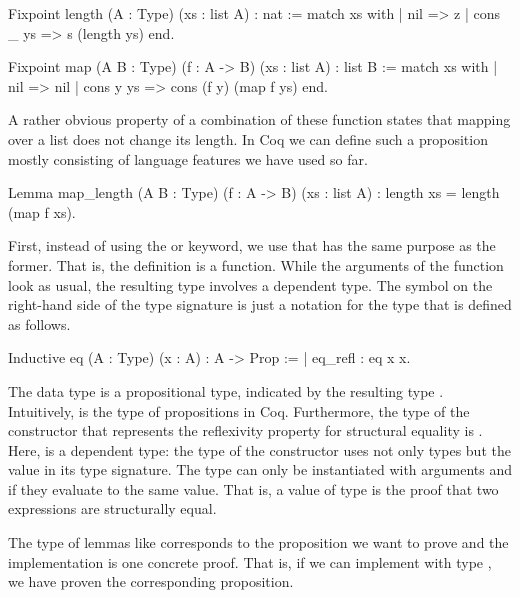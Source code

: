 \begin{coqcode}
Fixpoint length (A : Type) (xs : list A) : nat :=
  match xs with
  | nil       => z
  | cons _ ys => s (length ys)
  end.

Fixpoint map (A B : Type) (f : A -> B) (xs : list A) : list B :=
  match xs with
  | nil => nil
  | cons y ys => cons (f y) (map f ys)
  end.
\end{coqcode}

A rather obvious property of a combination of these function states that mapping over a list does not change its length.
In Coq we can define such a proposition mostly consisting of language features we have used so far.

\begin{coqcode}
Lemma map_length (A B : Type) (f : A -> B) (xs : list A)
  : length xs = length (map f xs).
\end{coqcode}

First, instead of using the  or  keyword, we use  that has the same purpose as the former.
That is, the definition  is a function.
While the arguments of the function  look as usual, the resulting type involves a dependent type.
The symbol \cinl{=} on the right\--hand side of the type signature is just a notation for the type  that is defined as follows.

\begin{coqcode}
Inductive eq (A : Type) (x : A) : A -> Prop :=
| eq_refl : eq x x.
\end{coqcode}

The data type  is a propositional type, indicated by the resulting type .
Intuitively,  is the type of propositions in Coq.
Furthermore, the type of the constructor  that represents the reflexivity property for structural equality is .
Here,  is a dependent type: the type of the constructor  uses not only types but the value  in its type signature.
The type  can only be instantiated with arguments  and  if they evaluate to the same value.
That is, a value of type  is the proof that two expressions are structurally equal.

The type of lemmas like  corresponds to the proposition we want to prove and the implementation is one concrete proof.
That is, if we can implement  with type , we have proven the corresponding proposition.

